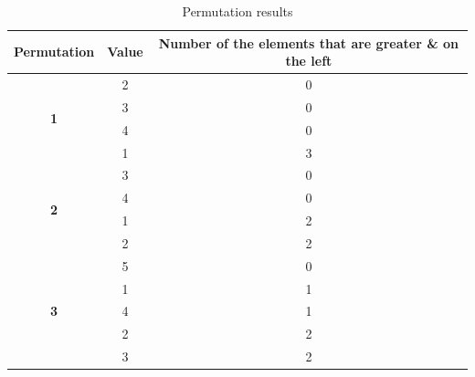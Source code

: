 \begin{table}[thpb]
	\centering
	\caption{Permutation results}
	\label{tab:problem14}
	\begin{tabular}{|c|c|c|}
		\hline
		\textbf{Permutation}        & \textbf{Value} & \textbf{Number of the elements that are greater \& on the left} \\ \hline
		\multirow{4}{*}{\textbf{1}} & 2              & 0                                                               \\ \cline{2-3} 
		& 3              & 0                                                               \\ \cline{2-3} 
		& 4              & 0                                                               \\ \cline{2-3} 
		& 1              & 3                                                               \\ \hline
		\multirow{4}{*}{\textbf{2}} & 3              & 0                                                               \\ \cline{2-3} 
		& 4              & 0                                                               \\ \cline{2-3} 
		& 1              & 2                                                               \\ \cline{2-3} 
		& 2              & 2                                                               \\ \hline
		\multirow{5}{*}{\textbf{3}} & 5              & 0                                                               \\ \cline{2-3} 
		& 1              & 1                                                               \\ \cline{2-3} 
		& 4              & 1                                                               \\ \cline{2-3} 
		& 2              & 2                                                               \\ \cline{2-3} 
		& 3              & 2                                                               \\ \hline
	\end{tabular}
\end{table}